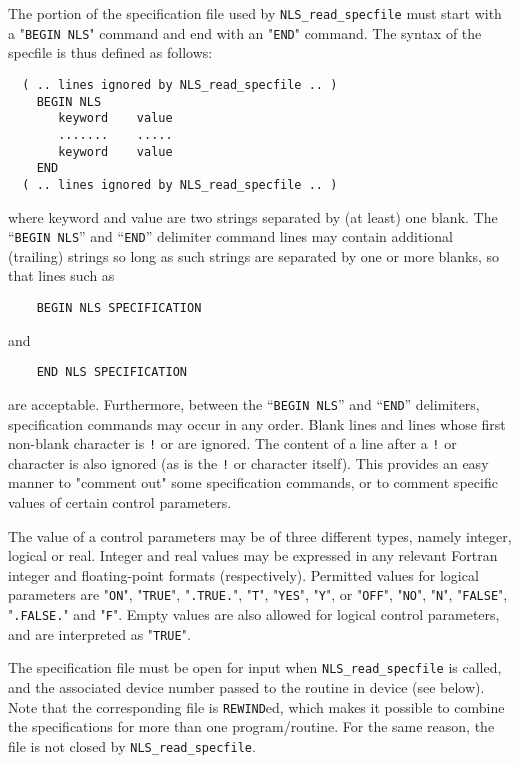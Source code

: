 \documentclass{galahad}
\newcommand{\packagename}{NLS}
\begin{document}
The portion of the specification file used by
{\tt \packagename\_read\_specfile}
must start
with a "{\tt BEGIN \packagename}" command and end with an
"{\tt END}" command.  The syntax of the specfile is thus defined as follows:
\begin{verbatim}
  ( .. lines ignored by NLS_read_specfile .. )
    BEGIN NLS
       keyword    value
       .......    .....
       keyword    value
    END
  ( .. lines ignored by NLS_read_specfile .. )
\end{verbatim}
where keyword and value are two strings separated by (at least) one blank.
The ``{\tt BEGIN \packagename}'' and ``{\tt END}'' delimiter command lines
may contain additional (trailing) strings so long as such strings are
separated by one or more blanks, so that lines such as
\begin{verbatim}
    BEGIN NLS SPECIFICATION
\end{verbatim}
and
\begin{verbatim}
    END NLS SPECIFICATION
\end{verbatim}
are acceptable. Furthermore,
between the
``{\tt BEGIN \packagename}'' and ``{\tt END}'' delimiters,
specification commands may occur in any order.  Blank lines and
lines whose first non-blank character is {\tt !} or {\tt *} are ignored.
The content
of a line after a {\tt !} or {\tt *} character is also
ignored (as is the {\tt !} or {\tt *}
character itself). This provides an easy manner to "comment out" some
specification commands, or to comment specific values
of certain control parameters.

The value of a control parameters may be of three different types, namely
integer, logical or real.
Integer and real values may be expressed in any relevant Fortran integer and
floating-point formats (respectively). Permitted values for logical
parameters are "{\tt ON}", "{\tt TRUE}", "{\tt .TRUE.}", "{\tt T}",
"{\tt YES}", "{\tt Y}", or "{\tt OFF}", "{\tt NO}",
"{\tt N}", "{\tt FALSE}", "{\tt .FALSE.}" and "{\tt F}".
Empty values are also allowed for
logical control parameters, and are interpreted as "{\tt TRUE}".

The specification file must be open for
input when {\tt \packagename\_read\_specfile}
is called, and the associated device number
passed to the routine in device (see below).
Note that the corresponding
file is {\tt REWIND}ed, which makes it possible to combine the specifications
for more than one program/routine.  For the same reason, the file is not
closed by {\tt \packagename\_read\_specfile}.
\end{document}
